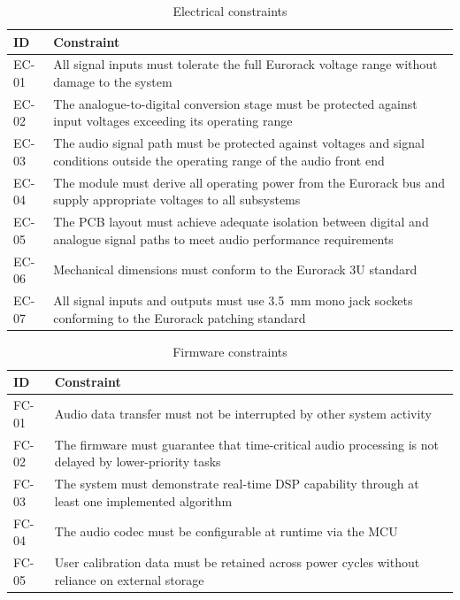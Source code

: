 \begin{table}[ht]
	\centering
	\caption{Electrical constraints}
	\label{tab:req-electrical}
	\begin{tabularx}{\linewidth}{@{} l X @{}}
		\toprule
		\textbf{ID} & \textbf{Constraint} \\
		\midrule
		\label{req:EC-01}EC-01 & All signal inputs must tolerate the full Eurorack voltage range without damage to the system \\
		\label{req:EC-02}EC-02 & The analogue-to-digital conversion stage must be protected against input voltages exceeding its operating range \\
		\label{req:EC-03}EC-03 & The audio signal path must be protected against voltages and signal conditions outside the operating range of the audio front end \\
		\label{req:EC-04}EC-04 & The module must derive all operating power from the Eurorack bus and supply appropriate voltages to all subsystems \\
		\label{req:EC-05}EC-05 & The PCB layout must achieve adequate isolation between digital and analogue signal paths to meet audio performance requirements \\
		\label{req:EC-06}EC-06 & Mechanical dimensions must conform to the Eurorack 3U standard \\
		\label{req:EC-07}EC-07 & All signal inputs and outputs must use \qty{3.5}{\milli\metre} mono jack sockets conforming to the Eurorack patching standard \\
		\bottomrule
	\end{tabularx}
\end{table}
\begin{table}[ht]
	\centering
	\caption{Firmware constraints}
	\label{tab:req-firmware}
	\begin{tabularx}{\linewidth}{@{} l X @{}}
		\toprule
		\textbf{ID} & \textbf{Constraint} \\
		\midrule
		\label{req:FC-01}FC-01 & Audio data transfer must not be interrupted by other system activity \\
		\label{req:FC-02}FC-02 & The firmware must guarantee that time-critical audio processing is not delayed by lower-priority tasks \\
		\label{req:FC-03}FC-03 & The system must demonstrate real-time DSP capability through at least one implemented algorithm \\
		\label{req:FC-04}FC-04 & The audio codec must be configurable at runtime via the MCU \\
		\label{req:FC-05}FC-05 & User calibration data must be retained across power cycles without reliance on external storage \\
		\bottomrule
	\end{tabularx}
\end{table}
